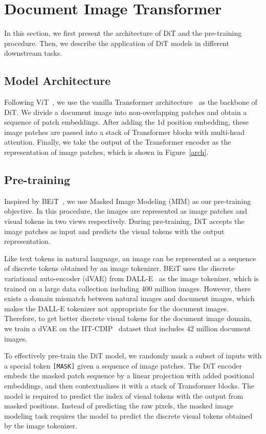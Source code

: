 \documentclass[sigconf]{acmart}
\begin{document}
\section{Document Image Transformer}
In this section, we first present the architecture of DiT and the pre-training procedure. Then, we describe the application of DiT models in different downstream tasks.

\subsection{Model Architecture}
Following ViT~\citep{dosovitskiy2020vit}, we use the vanilla Transformer architecture~\citep{vaswani2017attention} as the backbone of DiT. We divide a document image into non-overlapping patches and obtain a sequence of patch embeddings. After adding the 1d position embedding, these image patches are passed into a stack of Transformer blocks with multi-head attention. Finally, we take the output of the Transformer encoder as the representation of image patches, which is shown in Figure~\ref{arch}.

\subsection{Pre-training}
Inspired by BEiT~\citep{bao2021beit}, we use Masked Image Modeling (MIM) as our pre-training objective. In this procedure, the images are represented as image patches and visual tokens in two views respectively. During pre-training, DiT accepts the image patches as input and predicts the visual tokens with the output representation. 

Like text tokens in natural language, an image can be represented as a sequence of discrete tokens obtained by an image tokenizer. BEiT uses the discrete variational auto-encoder (dVAE) from DALL-E~\citep{ramesh2021zeroshot} as the image tokenizer, which is trained on a large data collection including 400 million images. However, there exists a domain mismatch between natural images and document images, which makes the DALL-E tokenizer not appropriate for the document images. Therefore, to get better discrete visual tokens for the document image domain, we train a dVAE on the IIT-CDIP~\citep{Lewis:2006:BTC:1148170.1148307} dataset that includes 42 million document images.

To effectively pre-train the DiT model, we randomly mask a subset of inputs with a special token {\tt[MASK]} given a sequence of image patches. The DiT encoder embeds the masked patch sequence by a linear projection with added positional embeddings, and then contextualizes it with a stack of Transformer blocks. The model is required to predict the index of visual tokens with the output from masked positions. Instead of predicting the raw pixels, the masked image modeling task requires the model to predict the discrete visual tokens obtained by the image tokenizer.
\end{document}
